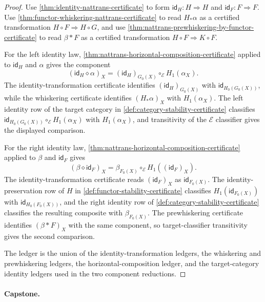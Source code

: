 \begin{proof}
Use \autoref{thm:identity-nattrans-certificate} to form $\mathsf{id}_H:H\Rightarrow H$ and $\mathsf{id}_F:F\Rightarrow F$. Use \autoref{thm:functor-whiskering-nattrans-certificate} to read $H_{\ast}\alpha$ as a certified transformation $H\circ F\Rightarrow H\circ G$, and use \autoref{thm:nattrans-prewhiskering-by-functor-certificate} to read $\beta\ast F$ as a certified transformation $H\circ F\Rightarrow K\circ F$.

For the left identity law, \autoref{thm:nattrans-horizontal-composition-certificate} applied to $\mathsf{id}_H$ and $\alpha$ gives the component
$$
(\mathsf{id}_H\diamond\alpha)_X
=
(\mathsf{id}_H)_{G_0(X)}\circ_{\mathcal E}H_1(\alpha_X).
$$
The identity-transformation certificate identifies $(\mathsf{id}_H)_{G_0(X)}$ with $\mathsf{id}_{H_0(G_0(X))}$, while the whiskering certificate identifies $(H_{\ast}\alpha)_X$ with $H_1(\alpha_X)$. The left identity row of the target category in \autoref{def:category-stability-certificate} classifies $\mathsf{id}_{H_0(G_0(X))}\circ_{\mathcal E}H_1(\alpha_X)$ with $H_1(\alpha_X)$, and transitivity of the $\mathcal E$ classifier gives the displayed comparison.

For the right identity law, \autoref{thm:nattrans-horizontal-composition-certificate} applied to $\beta$ and $\mathsf{id}_F$ gives
$$
(\beta\diamond\mathsf{id}_F)_X
=
\beta_{F_0(X)}\circ_{\mathcal E}H_1((\mathsf{id}_F)_X).
$$
The identity-transformation certificate reads $(\mathsf{id}_F)_X$ as $\mathsf{id}_{F_0(X)}$. The identity-preservation row of $H$ in \autoref{def:functor-stability-certificate} classifies $H_1(\mathsf{id}_{F_0(X)})$ with $\mathsf{id}_{H_0(F_0(X))}$, and the right identity row of \autoref{def:category-stability-certificate} classifies the resulting composite with $\beta_{F_0(X)}$. The prewhiskering certificate identifies $(\beta\ast F)_X$ with the same component, so target-classifier transitivity gives the second comparison.

The ledger is the union of the identity-transformation ledgers, the whiskering and prewhiskering ledgers, the horizontal-composition ledger, and the target-category identity ledgers used in the two component reductions.
\end{proof}

\paragraph{Capstone.}

